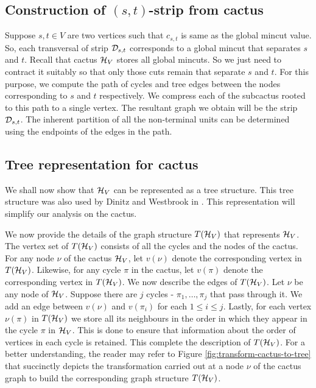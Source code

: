 \subsection*{Construction of $(s,t)$-strip from cactus}
\label{sec:construction-strip-cactus}
Suppose $s,t \in V$ are two vertices such that $c_{s,t}$ is same as the global mincut value. 
So, each transversal of strip ${\cal D}_{s,t}$ corresponds to a global mincut that separates $s$ and $t$. Recall that cactus ${\cal H}_V$ stores all global mincuts. So we just need to contract it suitably so that only those cuts remain that separate $s$ and $t$. For this purpose,
we compute the path of cycles and tree edges between the nodes corresponding to $s$ and $t$ respectively. We compress each of the subcactus rooted to this path to a single vertex. The resultant graph we obtain will be the strip ${\cal D}_{s,t}$. The inherent partition of all the non-terminal units can be determined using the endpoints of the edges in the path.

\subsection*{Tree representation for cactus}


We shall now show that ${\cal H}_V$ can be represented as a tree structure. This tree structure was also used by Dinitz and Westbrook in \cite{DBLP:journals/algorithmica/DinitzW98}. This representation will simplify our analysis on the cactus.

We now provide the details of the graph structure $T({\cal H}_V)$ that represents ${\cal H}_V$. The vertex set of $T({\cal H}_V)$ consists of all the cycles and the nodes of the cactus. For any node $\nu$ of the cactus ${\cal H}_V$, let $v(\nu)$ denote the corresponding vertex in $T({\cal H}_V)$. Likewise, for any cycle $\pi$ in the cactus, let $v(\pi)$ denote the corresponding vertex in $T({\cal H}_V)$. We now describe the edges of  $T({\cal H}_V)$. Let $\nu$ be any node of ${\cal H}_V$. Suppose there are $j$ cycles - $\pi_1,\ldots,\pi_j$ that pass through it. We add an edge between $v(\nu)$ and $v(\pi_i)$ for each $1\le i\le j$. Lastly, for each vertex $\nu(\pi)$ in $T{({\cal H}_V)}$ we store all its neighbours in the order in which they appear in the cycle $\pi$ in ${\cal H}_V$. This is done to ensure that information about the order of vertices in each cycle is retained. This complete the description of $T({\cal H}_V)$. For a better understanding, the reader may refer to Figure \ref{fig:transform-cactus-to-tree} that succinctly depicts the transformation carried out at a node $\nu$ of the cactus graph to build the corresponding graph structure $T({\cal H}_V)$. 

